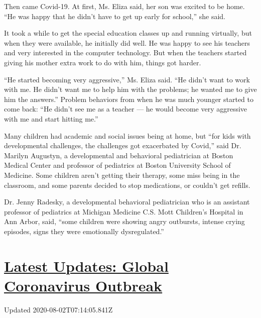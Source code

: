 Then came Covid-19. At first, Ms. Eliza said, her son was excited to be
home. ``He was happy that he didn't have to get up early for school,''
she said.

It took a while to get the special education classes up and running
virtually, but when they were available, he initially did well. He was
happy to see his teachers and very interested in the computer
technology. But when the teachers started giving his mother extra work
to do with him, things got harder.

``He started becoming very aggressive,'' Ms. Eliza said. ``He didn't
want to work with me. He didn't want me to help him with the problems;
he wanted me to give him the answers.'' Problem behaviors from when he
was much younger started to come back: ``He didn't see me as a teacher
--- he would become very aggressive with me and start hitting me.''

Many children had academic and social issues being at home, but ``for
kids with developmental challenges, the challenges got exacerbated by
Covid,'' said Dr. Marilyn Augustyn, a developmental and behavioral
pediatrician at Boston Medical Center and professor of pediatrics at
Boston University School of Medicine. Some children aren't getting their
therapy, some miss being in the classroom, and some parents decided to
stop medications, or couldn't get refills.

Dr. Jenny Radesky, a developmental behavioral pediatrician who is an
assistant professor of pediatrics at Michigan Medicine C.S. Mott
Children's Hospital in Ann Arbor, said, ``some children were showing
angry outbursts, intense crying episodes, signs they were emotionally
dysregulated.''

\hypertarget{latest-updates-global-coronavirus-outbreak}{%
\section{\texorpdfstring{\href{https://www.nytimes.com/2020/08/01/world/coronavirus-covid-19.html?action=click\&pgtype=Article\&state=default\&region=MAIN_CONTENT_1\&context=storylines_live_updates}{Latest
Updates: Global Coronavirus
Outbreak}}{Latest Updates: Global Coronavirus Outbreak}}\label{latest-updates-global-coronavirus-outbreak}}

Updated 2020-08-02T07:14:05.841Z

